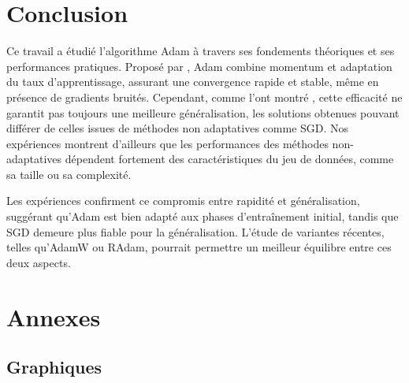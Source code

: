 \documentclass[a4paper,12pt]{article}
\begin{document}
\section{Conclusion}

Ce travail a étudié l’algorithme Adam à travers ses fondements
théoriques et ses performances pratiques. Proposé par
\cite{kingma2014}, Adam combine momentum et adaptation du taux
d’apprentissage, assurant une convergence rapide et stable, même en
présence de gradients bruités. Cependant, comme l’ont montré
\cite{wilson2017}, cette efficacité ne garantit pas toujours une
meilleure généralisation, les solutions obtenues pouvant différer de
celles issues de méthodes non adaptatives comme SGD. Nos expériences montrent d'ailleurs que les performances des méthodes non-adaptatives dépendent fortement des caractéristiques du jeu de données, comme sa taille ou sa complexité.


Les expériences confirment ce compromis entre rapidité et
généralisation, suggérant qu’Adam est bien adapté aux phases
d’entraînement initial, tandis que SGD demeure plus fiable pour la
généralisation. L’étude de variantes récentes, telles qu’AdamW ou
RAdam, pourrait permettre un meilleur équilibre entre ces deux aspects.




\newpage

\appendix
\section{Annexes}
\label{annexes}

\subsection{Graphiques}
\end{document}
